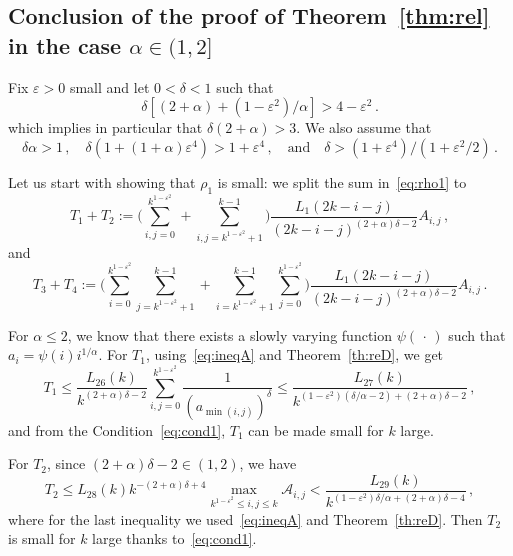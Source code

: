 \documentclass[10pt]{amsart}
\theoremstyle{definition}\newtheorem{defi}[theo]{Definition}\newtheorem{rema}[theo]{Remark}\newtheorem{exam}[theo]{Example}\newtheorem{exem}[theo]{Example}\newtheorem{nota}[theo]{Notation}
\newcommand{\ga}{\alpha}
\newcommand{\gd}{\delta}
\newcommand{\gep}{\varepsilon}
\newcommand{\cA}{\ensuremath{\mathcal{A}}}
\begin{document}
\subsection{Conclusion of the proof of Theorem~\ref{thm:rel} in the case \texorpdfstring{$\ga\in(1,2]$}{ga in(1,2]}}\label{sec:ga1}

Fix $\gep >0$ small and let $0 < \delta <1$ such that
\begin{equation}\label{eq:cond1}
\delta \left[(2+\ga) + (1-\gep^2)/\ga \right] > 4 - \gep^2\,.
\end{equation}
which implies in particular that $\delta (2+\ga) > 3$. We also assume that
\begin{equation}\label{eq:cond2}
\gd\ga >1\,, \quad \gd (1+(1+\ga) \gep^4 ) > 1+\gep^4\,, \quad \text{and}\quad \gd>(1+\gep^4)/(1+\gep^2/2)\,.
\end{equation}



Let us start with showing that $\rho_1$ is small: we split the sum in~\eqref{eq:rho1} to
\begin{equation}
T_1 + T_2 := \bigg(\sum_{i,j=0}^{ k^{1- \gep^2} } + \sum_{i,j= k^{1- \gep^2} + 1}^{k-1} \bigg) \frac{L_1(2 k -i-j) }{(2k -i-j)^{(2+\ga)\delta -2}} A_{i,j}\,,
\end{equation}
and
\begin{equation}
T_3 + T_4 := \bigg(\sum_{i=0}^{ k^{1- \gep^2} } \sum_{j= k^{1- \gep^2} + 1}^{k-1} + \sum_{i= k^{1- \gep^2} + 1}^{k-1} \sum_{j=0}^{ k^{1- \gep^2} } \bigg) \frac{L_1(2 k -i-j)}{(2k -i-j)^{(2+\ga)\delta -2}} A_{i,j}\,.
\end{equation}



For $\ga\leq 2$, we know that there exists a slowly varying function $\psi({\,\cdot\,})$ such that $a_i = \psi(i) i^{1/\ga}$. For $T_1$, using~\eqref{eq:ineqA} and Theorem~\ref{th:reD}, we get
\begin{equation}
T_1 \le \frac{L_{26}(k)}{k^{(2+\ga) \delta - 2}} \sum_{i,j =0}^{k^{1-\gep^2}} \frac{1}{(a_{\min(i,j)})^\gd} \leq \frac{L_{27}(k)}{k^{(1-\gep^2) (\delta/\ga - 2) +(2+\ga) \delta - 2}}\,,
\end{equation}
and from the Condition~\eqref{eq:cond1}, $T_1$ can be made small for $k$ large.


For $T_2$, since $(2+\ga)\gd-2 \in(1,2)$, we have
\begin{equation}
T_2 \le L_{28}(k) k^{-(2+\ga)\gd + 4} \max_{k^{1-\gep^2} \le i,j \le k} \cA_{i,j} < \frac{L_{29}(k)}{k^{(1- \gep^2)\delta/\ga +(2+\ga)\gd-4}}\,,
\end{equation}
where for the last inequality we used~\eqref{eq:ineqA} and Theorem~\ref{th:reD}. Then $T_2$ is small for $k$ large thanks to~\eqref{eq:cond1}.
\end{document}
